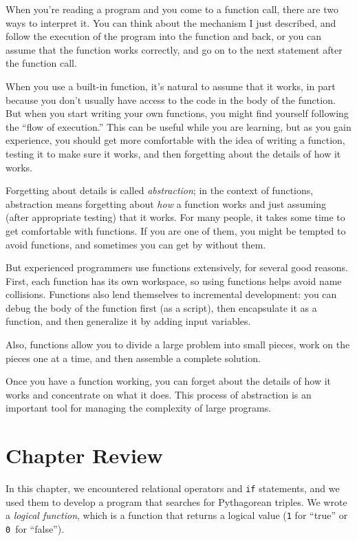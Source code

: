 When you're reading a program and you come to a function call,
there are two ways to interpret it. You can think about the mechanism I just described,
and follow the execution of the program into the function and back, or you can assume that the function works correctly, and go on to the next statement after the function call.

When you use a built-in function, it's natural to assume that it works, in part because you don't
usually have access to the code in the body of the function.
But when you start writing your own functions, you might
find yourself following the ``flow of execution.''  This can
be useful while you are learning, but as you gain experience, you
should get more comfortable with the idea of writing a function,
testing it to make sure it works, and then forgetting about the
details of how it works.


Forgetting about details is called \emph{abstraction}; in the context
of functions, abstraction means forgetting about \emph{how} a function
works and just assuming (after appropriate testing) that it works.
For many people, it takes some time to get comfortable with functions.  If you are one of them, you might be tempted to avoid functions, and sometimes you can get by without them.

But experienced programmers use functions extensively, for several good reasons. First, each function has its own workspace, so using functions helps
avoid name collisions.
Functions also lend themselves to incremental development: you can
debug the body of the function first (as a script), then encapsulate
it as a function, and then generalize it by adding input variables.

Also, functions allow you to divide a large problem into small
pieces, work on the pieces one at a time, and then assemble a
complete solution.

Once you have a function working, you can forget about the
details of how it works and concentrate on what it does.  This
process of abstraction is an important tool for managing the
complexity of large programs.


\section{Chapter Review}

In this chapter, we encountered relational operators and \lstinline{if} statements, and we used them to develop a program that searches for Pythagorean triples.
We wrote a \emph{logical function}, which is a function that returns a logical value
(\lstinline{1} for ``true'' or \lstinline{0}~for ``false'').

